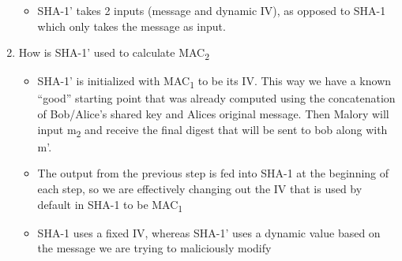 \documentclass[11pt]{article}
\begin{document}
\begin{enumerate}
\begin{itemize}
\item SHA-1' takes 2 inputs (message and dynamic IV), as opposed to SHA-1 which only takes the message as input.
\end{itemize}
\item How is SHA-1' used to calculate MAC\textsubscript{2}
\begin{itemize}
\item SHA-1' is initialized with MAC\textsubscript{1} to be its IV. This way we have a known ``good'' starting point that was already computed using the concatenation of Bob/Alice's shared key and Alices original message. Then Malory will input m\textsubscript{2} and receive the final digest that will be sent to bob along with m'.
\item The output from the previous step is fed into SHA-1 at the beginning of each step, so we are effectively changing out the IV that is used by default in SHA-1 to be MAC\textsubscript{1}
\item SHA-1 uses a fixed IV, whereas SHA-1' uses a dynamic value based on the message we are trying to maliciously modify
\end{itemize}
\end{enumerate}
\end{document}
